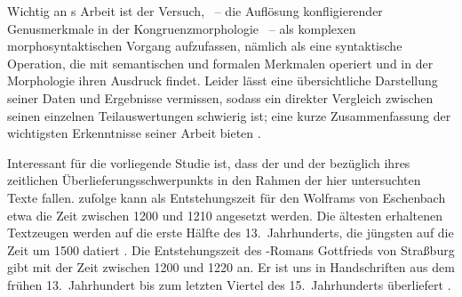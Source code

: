Wichtig an \citeauthor{askedal1973}s Arbeit ist der Versuch, ~-- die Auflösung konfligierender
Genusmerkmale in der Kongruenz\-morphologie \autocites(siehe
){corbett1983}~-- als komplexen morphosyntaktischen
Vorgang aufzufassen, nämlich als eine syntaktische Operation, die mit
semantischen und formalen
Merkmalen operiert und in der Morphologie ihren
Ausdruck findet. Leider lässt \citet{askedal1973} eine übersichtliche
Darstellung seiner Daten und Ergebnisse vermissen, sodass ein direkter
Vergleich zwischen seinen einzelnen Teilauswertungen schwierig ist; eine kurze
Zusammenfassung der wichtigsten Erkenntnisse seiner Arbeit bieten
\citet[118--119]{fleischerschallert2011}.

Interessant für die vorliegende Studie ist, dass der  und der
 bezüglich ihres zeitlichen
Überlieferungsschwerpunkts in den
Rahmen der hier untersuchten Texte fallen. \citet[1378]{bumke1999} zufolge kann
als Entstehungszeit für den  Wolframs von Eschenbach etwa die
Zeit zwischen 1200 und 1210 angesetzt werden. Die ältesten erhaltenen
Textzeugen werden auf die erste Hälfte des 13.~Jahrhunderts, die jüngsten auf
die Zeit um 1500 datiert
\autocites[1381]{bumke1999}[vgl.~auch][s.\,v.~\textit{Wolfram von Eschenbach:
}]{hsc}. Die Entstehungszeit des -Romans Gottfrieds
von Straßburg gibt \citet[155]{kuhn1982} mit der
Zeit zwischen 1200 und 1220 an. Er ist uns in Handschriften aus dem frühen
13.~Jahrhundert bis zum letzten Viertel des 15.~Jahrhunderts überliefert
\autocite[vgl.][s.\,v.~\textit{Gottfried von Straßburg: }]{hsc}.


